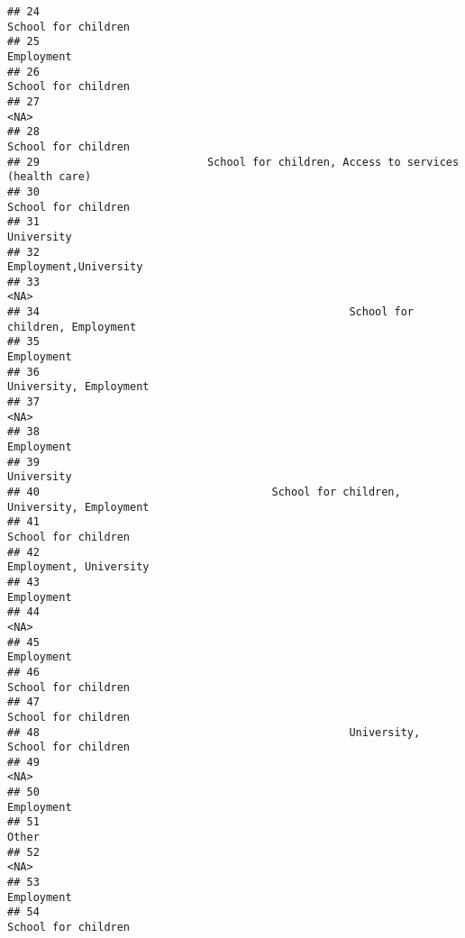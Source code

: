 \documentclass[
]{article}
\begin{document}
\begin{verbatim}
## 24                                                            School for children
## 25                                                                     Employment
## 26                                                            School for children
## 27                                                                           <NA>
## 28                                                            School for children
## 29                          School for children, Access to services (health care)
## 30                                                            School for children
## 31                                                                     University
## 32                                                          Employment,University
## 33                                                                           <NA>
## 34                                                School for children, Employment
## 35                                                                     Employment
## 36                                                         University, Employment
## 37                                                                           <NA>
## 38                                                                     Employment
## 39                                                                     University
## 40                                    School for children, University, Employment
## 41                                                            School for children
## 42                                                         Employment, University
## 43                                                                     Employment
## 44                                                                           <NA>
## 45                                                                     Employment
## 46                                                            School for children
## 47                                                            School for children
## 48                                                University, School for children
## 49                                                                           <NA>
## 50                                                                     Employment
## 51                                                                          Other
## 52                                                                           <NA>
## 53                                                                     Employment
## 54                                                            School for children

\end{verbatim}
\end{document}
